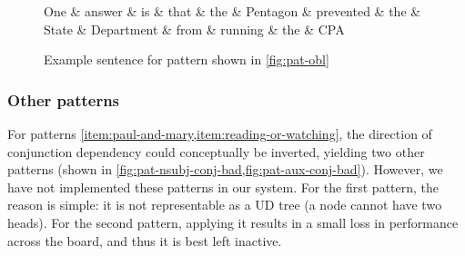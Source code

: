 \documentclass[11pt,a4paper]{article}
\begin{document}
\begin{figure*}[ht]
    \centering
    \begin{dependency}
    \begin{deptext}[column sep=0.1cm]
    One \& answer \& is \& that \& the \& Pentagon \& prevented \& the \& State \& Department \& from \& running \& the \& CPA  \\
    \end{deptext}
    \end{dependency}
    \caption{Example sentence for pattern shown in \cref{fig:pat-obl}}
    \label{fig:rel-clause}
\end{figure*}



\subsubsection{Other patterns}
For patterns \cref{item:paul-and-mary,item:reading-or-watching},
the direction of conjunction dependency could conceptually be
inverted, yielding two other patterns (shown in
\cref{fig:pat-nsubj-conj-bad,fig:pat-aux-conj-bad}). However, we
have not implemented these patterns in our system. For the first
pattern, the reason is simple: it is not representable as a UD
tree (a node cannot have two heads). For the second pattern,
applying it results in a small loss in performance across the
board, and thus it is best left inactive.
\end{document}
